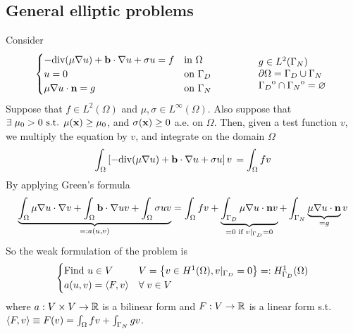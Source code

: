 \subsection*{General elliptic problems}
Consider 
\begin{equation}
    \begin{cases}
        -\text{div}(\mu \nabla u)+ \textbf{b}\cdot \nabla u + \sigma u = f& \text{in } \Omega \\
        u = 0 & \text{on }\Gamma_D \\
        \mu \nabla u \cdot \textbf{n} = g & \text{on } \Gamma_N
    \end{cases}
    \qquad\qquad
    \begin{array}{l}
        g \in L^2(\Gamma_N) \\
        \partial\Omega = \Gamma_D \cup \Gamma_N \\
        {\kern0pt\Gamma_D}^{\mathrm{o}} \cap {\kern0pt\Gamma_N}^{\mathrm{o}} = \varnothing
    \end{array}
\end{equation}
Suppose that \(f \in L^2(\Omega)\) and \(\mu, \sigma \in L^\infty(\Omega)\). Also suppose that \(\exists \; \mu_0 > 0 \text{ s.t. } \mu(\textbf{x}) \geq \mu_0\), and \(\sigma(\textbf{x}) \geq 0\) a.e. on \(\Omega\).  
Then, given a test function \(v\), we multiply the equation by \(v\), and integrate on the domain \(\Omega\)
\begin{equation*}
    \int_\Omega \left[-\text{div}(\mu \nabla u)+ \textbf{b}\cdot \nabla u + \sigma u\right] v \,  = \int_\Omega f v 
\end{equation*}
By applying Green's formula 
\begin{equation*}
    \underbrace{\int_\Omega \mu\nabla u \cdot \nabla v  + \int_\Omega \textbf{b} \cdot \nabla u v + \int_\Omega \sigma u v}_{=: a(u,v)} = \int_\Omega f v +\underbrace{\int_{\Gamma_D} \mu \nabla u \cdot \textbf{n} v}_{= 0 \text{ if } v\vert_{\Gamma_D} = 0} + \int_{\Gamma_N} \underbrace{\mu \nabla u \cdot \textbf{n}}_{= g} v 
\end{equation*}
So the weak formulation of the problem is 
\begin{equation}
    \begin{cases}
        \text{Find } u \in V & V = \left\{v \in H^1(\Omega), v\vert_{\Gamma_D} = 0\right\} =: H^1_{\Gamma_D}(\Omega)\\
        a(u,v) = \langle F,v \rangle & \forall \; v \in V \label{Weak Formulation of Boundary Value Problems}
    \end{cases}
\end{equation}
where \(a: V \times V \to \mathbb{R}\) is a bilinear form and \(F:V \to \mathbb{R}\) is a linear form s.t. \(\langle F,v \rangle \equiv F(v) = \int_\Omega fv + \int_{\Gamma_N} gv\).
